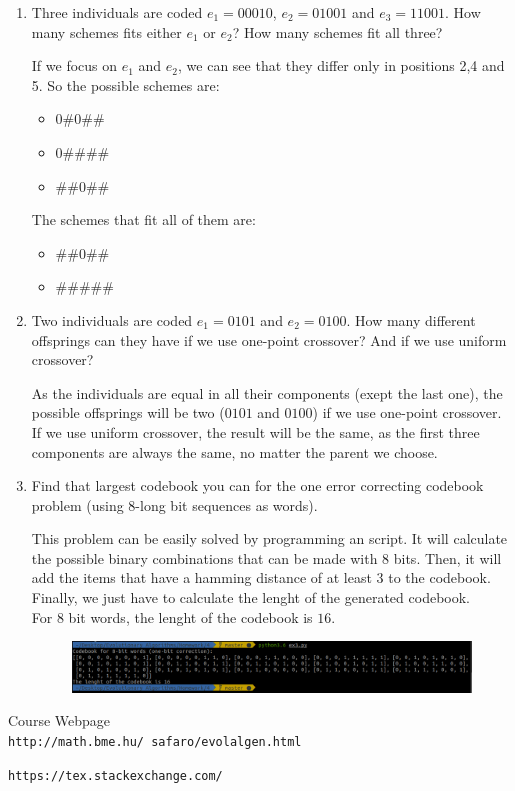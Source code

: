 \documentclass[12pt,english]{article}
\newenvironment{statement}{\fontfamily{ptm}\selectfont}{\par}
\begin{document}
\begin{enumerate}

	\item
		\begin{statement}
		Three individuals are coded $e_1 = 00010$, $e_2 = 01001$ and $e_3 = 11001$. How many schemes fits either $e_1$ or $e_2$? How many schemes fit all three?
		\end{statement}
		If we focus on $e_1$ and $e_2$, we can see that they differ only in positions 2,4 and 5. So the possible schemes are:
		\begin{itemize}
			\item 0\#0\#\#
			\item 0\#\#\#\#
			\item \#\#0\#\#
		\end{itemize}
		The schemes that fit all of them are:
		\begin{itemize}
			\item \#\#0\#\#
			\item \#\#\#\#\#
		\end{itemize}


	\item
		\begin{statement}
		Two individuals are coded $e_1 = 0101$ and $e_2 = 0100$. How many different offsprings can they have if we use one-point crossover? And if we use uniform crossover?
		\end{statement}
		As the individuals are equal in all their components (exept the last one), the possible offsprings will be two ($0101$ and $0100$) if we use one-point crossover.\\
		If we use uniform crossover, the result will be the same, as the first three components are always the same, no matter the parent we choose.


	\item
		\begin{statement}
		Find that largest codebook you can for the one error correcting codebook problem (using 8-long bit sequences as words).
		\end{statement}

		This problem can be easily solved by programming an script. It will
		calculate the possible binary combinations that can be made with $8$ bits. Then,
		it will add the items that have a hamming distance of at least $3$ to the codebook.
		Finally, we just have to calculate the lenght of the generated codebook.\\

		For $8$ bit words, the lenght of the codebook is $16$.

		\begin{figure}[H]
			\centering
			\includegraphics[scale=0.5]{ex3_output.png}
		\end{figure}


\end{enumerate}


\begin{thebibliography}{9}

Course Webpage
\\\texttt{http://math.bme.hu/~safaro/evolalgen.html}


\texttt{https://tex.stackexchange.com/}


\end{thebibliography}
\end{document}
